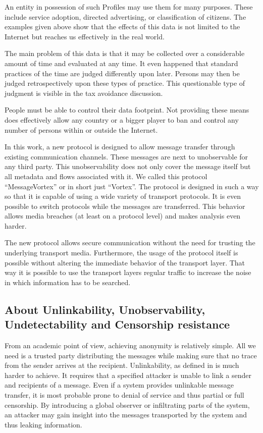 \documentclass[10pt,journal,compsoc]{IEEEtran}
\begin{document}
An entity in possession of such Profiles may use them for many purposes. These include service adoption, directed advertising, or classification of citizens. The examples given above show that the effects of this data is not limited to the Internet but reaches us effectively in the real world.

The main problem of this data is that it may be collected over a considerable amount of time and evaluated at any time. It even happened that standard practices of the time are judged differently upon later. Persons may then be judged retrospectively upon these types of practice. This questionable type of judgment is visible in the tax avoidance discussion. 

People must be able to control their data footprint. Not providing these means does effectively allow any country or a bigger player to ban and control any number of persons within or outside the Internet.  

In this work, a new protocol is designed to allow message transfer through existing communication channels. These messages are next to unobservable for any third party. This unobservability does not only cover the message itself but all metadata and flows associated with it. We called this protocol ``MessageVortex'' or in short just ``Vortex''. The protocol is designed in such a way so that it is capable of using a wide variety of transport protocols. It is even possible to switch protocols while the messages are transferred. This behavior allows media breaches (at least on a protocol level) and makes analysis even harder.

The new protocol allows secure communication without the need for trusting the underlying transport media. Furthermore, the usage of the protocol itself is possible without altering the immediate behavior of the transport layer. That way it is possible to use the transport layers regular traffic to increase the noise in which information has to be searched. 

\subsection{About Unlinkability, Unobservability, Undetectability and Censorship resistance}
From an academic point of view, achieving anonymity is relatively simple. All we need is a trusted party distributing the messages while making sure that no trace from the sender arrives at the recipient. Unlinkability, as defined in \cite{anon_terminology} is much harder to achieve. It requires that a specified attacker is unable to link a sender and recipients of a message. Even if a system provides unlinkable message transfer, it is most probable prone to denial of service and thus partial or full censorship. By introducing a global observer or infiltrating parts of the system, an attacker may gain insight into the messages transported by the system and thus leaking information.
\end{document}
